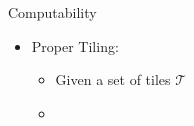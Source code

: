 \documentclass[usenames,dvipsnames]{beamer}
\newcommand{\cT}{\mathcal{T}}
\begin{document}
\begin{frame}{Computability}
    \begin{itemize}
        \item Proper Tiling:
        \begin{itemize}
            \item Given a set of tiles $\cT$
            \item[]
\end{itemize}
\end{itemize}
\end{frame}
\end{document}
